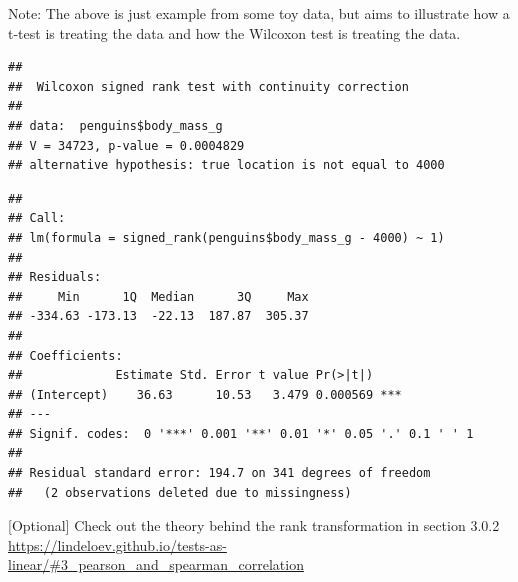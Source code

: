 \documentclass[
  openany]{book}
\newenvironment{Shaded}{\begin{snugshade}}{\end{snugshade}}
\newcommand{\AttributeTok}[1]{\textcolor[rgb]{0.77,0.63,0.00}{#1}}
\newcommand{\CommentTok}[1]{\textcolor[rgb]{0.56,0.35,0.01}{\textit{#1}}}
\newcommand{\ControlFlowTok}[1]{\textcolor[rgb]{0.13,0.29,0.53}{\textbf{#1}}}
\newcommand{\DecValTok}[1]{\textcolor[rgb]{0.00,0.00,0.81}{#1}}
\newcommand{\FunctionTok}[1]{\textcolor[rgb]{0.00,0.00,0.00}{#1}}
\newcommand{\NormalTok}[1]{#1}
\newcommand{\OtherTok}[1]{\textcolor[rgb]{0.56,0.35,0.01}{#1}}
\newcommand{\SpecialCharTok}[1]{\textcolor[rgb]{0.00,0.00,0.00}{#1}}
\begin{document}
Note: The above is just example from some toy data, but aims to illustrate how a t-test is treating the data and how the Wilcoxon test is treating the data.

\begin{Shaded}
\end{Shaded}

\begin{verbatim}
## 
##  Wilcoxon signed rank test with continuity correction
## 
## data:  penguins$body_mass_g
## V = 34723, p-value = 0.0004829
## alternative hypothesis: true location is not equal to 4000
\end{verbatim}

\begin{Shaded}
\end{Shaded}

\begin{verbatim}
## 
## Call:
## lm(formula = signed_rank(penguins$body_mass_g - 4000) ~ 1)
## 
## Residuals:
##     Min      1Q  Median      3Q     Max 
## -334.63 -173.13  -22.13  187.87  305.37 
## 
## Coefficients:
##             Estimate Std. Error t value Pr(>|t|)    
## (Intercept)    36.63      10.53   3.479 0.000569 ***
## ---
## Signif. codes:  0 '***' 0.001 '**' 0.01 '*' 0.05 '.' 0.1 ' ' 1
## 
## Residual standard error: 194.7 on 341 degrees of freedom
##   (2 observations deleted due to missingness)
\end{verbatim}

{[}Optional{]} Check out the theory behind the rank transformation in section 3.0.2 \url{https://lindeloev.github.io/tests-as-linear/\#3_pearson_and_spearman_correlation}
\end{document}
